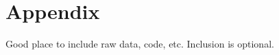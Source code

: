 



\appendix
\gdef\thesection{Appendix \Alph{section}}

\appendix

\section{Appendix}

Good place to include raw data, code, etc. Inclusion is optional.
